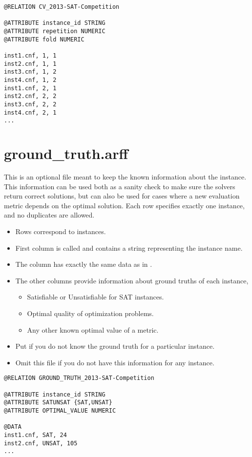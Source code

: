 \documentclass[]{elsarticle}
\begin{document}
\begin{lstlisting}[caption=Example cv.arff for two times a $2$-fold cross validation]
@RELATION CV_2013-SAT-Competition

@ATTRIBUTE instance_id STRING
@ATTRIBUTE repetition NUMERIC
@ATTRIBUTE fold NUMERIC

inst1.cnf, 1, 1
inst2.cnf, 1, 1
inst3.cnf, 1, 2
inst4.cnf, 1, 2
inst1.cnf, 2, 1
inst2.cnf, 2, 2
inst3.cnf, 2, 2
inst4.cnf, 2, 1
...
\end{lstlisting}


\section{ground\_truth.arff}

This is an optional file meant to keep the known information about the instance. This information can be 
used both as a sanity check to make sure the solvers return correct solutions, but can also be used for
cases where a new evaluation metric depends on the optimal solution. Each row specifies exactly one
instance, and no duplicates are allowed.

\begin{itemize}
  	\item Rows correspond to instances.
  	\item First column is called  and contains a string representing the instance name.
 	\item The  column has exactly the same data as in .
	\item The other columns provide information about ground truths of each instance, \eg{}
  		\begin{itemize}
    			\item Satisfiable or Unsatisfiable for SAT instances.
    			\item Optimal quality of optimization problems.
			\item Any other known optimal value of a metric.
  		\end{itemize}
  	\item Put \qm if you do not know the ground truth for a particular instance.
  	\item Omit this file if you do not have this information for any instance.
\end{itemize}

\begin{lstlisting}[caption=Example ground\_truth.arff]
@RELATION GROUND_TRUTH_2013-SAT-Competition

@ATTRIBUTE instance_id STRING
@ATTRIBUTE SATUNSAT {SAT,UNSAT}
@ATTRIBUTE OPTIMAL_VALUE NUMERIC

@DATA
inst1.cnf, SAT, 24
inst2.cnf, UNSAT, 105
...
\end{lstlisting}
\end{document}
